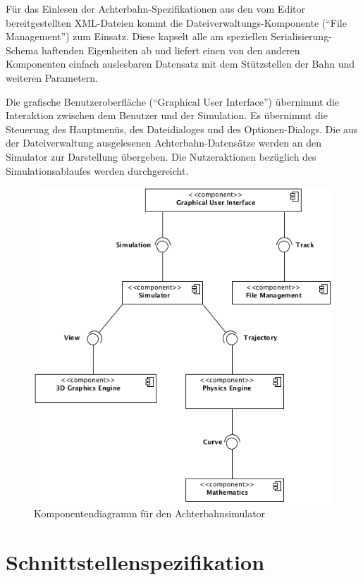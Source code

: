Für das Einlesen der Achterbahn-Spezifikationen aus den vom Editor bereitgestellten
XML-Dateien kommt die Dateiverwaltungs-Komponente (``File Management'') zum Einsatz. Diese kapselt alle
am speziellen Serialisierung-Schema haftenden Eigenheiten ab und liefert einen
von den anderen Komponenten einfach auslesbaren Datensatz mit dem Stützstellen der
Bahn und weiteren Parametern.

Die grafische Benutzeroberfläche (``Graphical User Interface'') übernimmt die Interaktion zwischen dem Benutzer und
der Simulation. Es übernimmt die Steuerung des Hauptmenüs, des Dateidialoges und
des Optionen-Dialogs. Die aus der Dateiverwaltung ausgelesenen Achterbahn-Datensätze 
werden an den Simulator zur Darstellung übergeben. Die Nutzeraktionen bezüglich des
Simulationsablaufes werden durchgereicht.

\begin{figure}
\includegraphics[width=\linewidth]{bilder/component_overview}
\caption{Komponentendiagramm für den Achterbahnsimulator}
\label{fig:component_overview}
\end{figure}

\section{Schnittstellenspezifikation}

